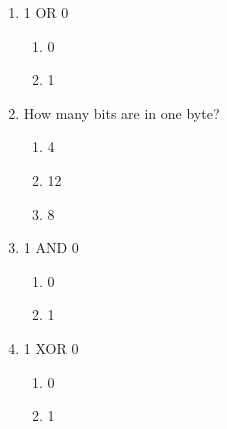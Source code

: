\documentclass[twocolumn]{article}
\begin{document}
\begin{enumerate}



  \item 1 OR 0

  \begin{enumerate}
   
   \item 0
   
   \item 1
   
  \end{enumerate}



  \item How many bits are in one byte?

  \begin{enumerate}
   
   \item 4
   
   \item 12
   
   \item 8
   
  \end{enumerate}



  \item 1 AND 0

  \begin{enumerate}
   
   \item 0
   
   \item 1
   
  \end{enumerate}



  \item 1 XOR 0

  \begin{enumerate}
   
   \item 0
   
   \item 1
   
  \end{enumerate}


\end{enumerate}


\end{document}
